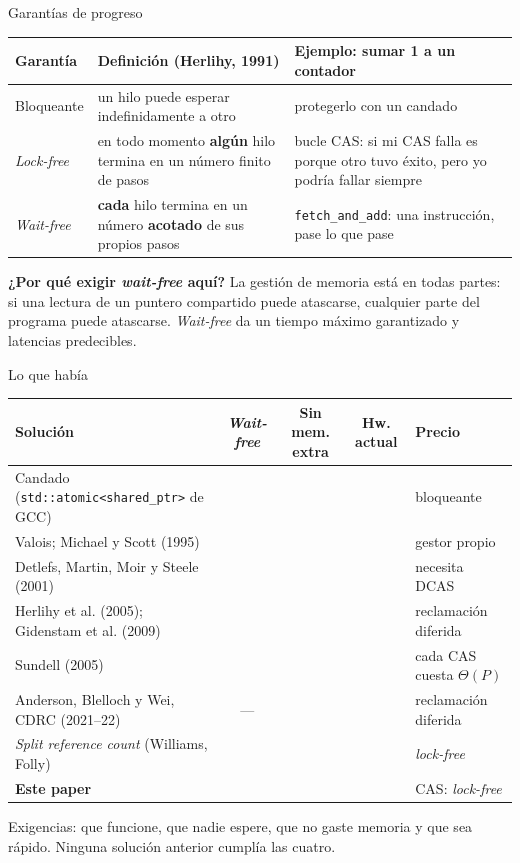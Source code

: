 \documentclass[aspectratio=169,11pt]{beamer}
\newcommand{\si}{\textcolor{ok}{\ding{51}}}
\newcommand{\no}{\textcolor{mal}{\ding{55}}}
\begin{document}
\begin{frame}{Garantías de progreso}
  \renewcommand{\arraystretch}{1.2}\small
  \begin{tabularx}{\linewidth}{@{}l X X@{}}
    \toprule
    \textbf{Garantía} & \textbf{Definición (Herlihy, 1991)} & \textbf{Ejemplo: sumar 1 a un contador}\\
    \midrule
    Bloqueante & un hilo puede esperar indefinidamente a otro & protegerlo con un candado\\
    \emph{Lock-free} & en todo momento \textbf{algún} hilo termina en un número finito de pasos & bucle CAS: si mi CAS falla es porque otro tuvo éxito, pero yo podría fallar siempre\\
    \emph{Wait-free} & \textbf{cada} hilo termina en un número \textbf{acotado} de sus propios pasos & \texttt{fetch\_and\_add}: una instrucción, pase lo que pase\\
    \bottomrule
  \end{tabularx}
  \vfill
  \small\textbf{¿Por qué exigir \emph{wait-free} aquí?} La gestión de memoria está en todas partes: si una lectura de un puntero compartido puede atascarse, cualquier parte del programa puede atascarse. \emph{Wait-free} da un tiempo máximo garantizado y latencias predecibles.
\end{frame}

\begin{frame}{Lo que había}
  \renewcommand{\arraystretch}{1.1}\footnotesize
  \begin{tabularx}{\linewidth}{@{}p{5.5cm} c c c X@{}}
    \toprule
    Solución & \emph{Wait-free} & Sin mem. extra & Hw. actual & Precio\\
    \midrule
    Candado (\texttt{std::atomic<shared\_ptr>} de GCC) & \no & \si & \si & bloqueante\\
    Valois; Michael y Scott (1995) & \no & \no & \si & gestor propio\\
    Detlefs, Martin, Moir y Steele (2001) & \no & \si & \no & necesita DCAS\\
    Herlihy et al. (2005); Gidenstam et al. (2009) & \no & \no & \si & reclamación diferida\\
    Sundell (2005) & \si & \si & \si & cada CAS cuesta $\Theta(P)$\\
    Anderson, Blelloch y Wei, CDRC (2021–22) & --- & \no & \si & reclamación diferida\\
    \emph{Split reference count} (Williams, Folly) & \no & \si & \si & \emph{lock-free}\\
    \midrule
    \textbf{Este paper} & \si & \si & \si & CAS: \emph{lock-free}\\
    \bottomrule
  \end{tabularx}
  \vfill
  \small Exigencias: que funcione, que nadie espere, que no gaste memoria y que sea rápido. Ninguna solución anterior cumplía las cuatro.
\end{frame}
\end{document}
